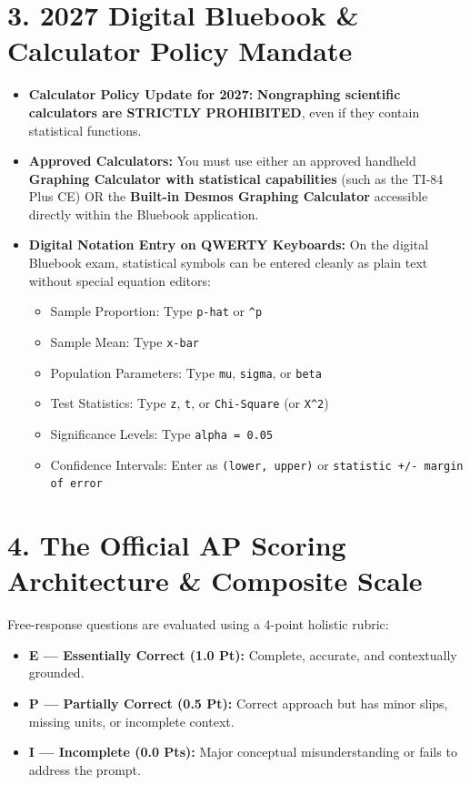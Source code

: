 \section*{3. 2027 Digital Bluebook \& Calculator Policy Mandate}
\begin{itemize}[leftmargin=1.5em]
  \item \textbf{Calculator Policy Update for 2027:} \textbf{Nongraphing scientific calculators are STRICTLY PROHIBITED}, even if they contain statistical functions.
  \item \textbf{Approved Calculators:} You must use either an approved handheld \textbf{Graphing Calculator with statistical capabilities} (such as the TI-84 Plus CE) OR the \textbf{Built-in Desmos Graphing Calculator} accessible directly within the Bluebook application.
  \item \textbf{Digital Notation Entry on QWERTY Keyboards:} On the digital Bluebook exam, statistical symbols can be entered cleanly as plain text without special equation editors:
  \begin{itemize}
    \item Sample Proportion: Type \texttt{p-hat} or \texttt{\^{}p}
    \item Sample Mean: Type \texttt{x-bar}
    \item Population Parameters: Type \texttt{mu}, \texttt{sigma}, or \texttt{beta}
    \item Test Statistics: Type \texttt{z}, \texttt{t}, or \texttt{Chi-Square} (or \texttt{X\^{}2})
    \item Significance Levels: Type \texttt{alpha = 0.05}
    \item Confidence Intervals: Enter as \texttt{(lower, upper)} or \texttt{statistic +/- margin of error}
  \end{itemize}
\end{itemize}

\section*{4. The Official AP Scoring Architecture \& Composite Scale}
Free-response questions are evaluated using a 4-point holistic rubric:
\begin{itemize}[leftmargin=1.5em]
  \item \textbf{E --- Essentially Correct (1.0 Pt):} Complete, accurate, and contextually grounded.
  \item \textbf{P --- Partially Correct (0.5 Pt):} Correct approach but has minor slips, missing units, or incomplete context.
  \item \textbf{I --- Incomplete (0.0 Pts):} Major conceptual misunderstanding or fails to address the prompt.
\end{itemize}

